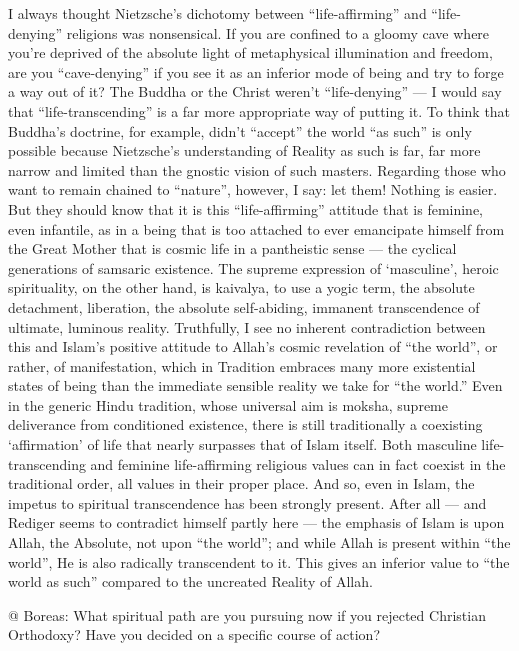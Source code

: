 \begin{footnotesize}
\begin{sffamily}
I always thought Nietzsche's dichotomy between ``life-affirming'' and ``life-denying'' religions was nonsensical. If you are confined to a gloomy cave where you're deprived of the absolute light of metaphysical illumination and freedom, are you ``cave-denying'' if you see it as an inferior mode of being and try to forge a way out of it? The Buddha or the Christ weren't ``life-denying'' --- I would say that ``life-transcending'' is a far more appropriate way of putting it. To think that Buddha's doctrine, for example, didn't ``accept'' the world ``as such'' is only possible because Nietzsche's understanding of Reality as such is far, far more narrow and limited than the gnostic vision of such masters. Regarding those who want to remain chained to ``nature'', however, I say: let them! Nothing is easier. But they should know that it is this ``life-affirming'' attitude that is feminine, even infantile, as in a being that is too attached to ever emancipate himself from the Great Mother that is cosmic life in a pantheistic sense --- the cyclical generations of samsaric existence. The supreme expression of `masculine', heroic spirituality, on the other hand, is kaivalya, to use a yogic term, the absolute detachment, liberation, the absolute self-abiding, immanent transcendence of ultimate, luminous reality. Truthfully, I see no inherent contradiction between this and Islam's positive attitude to Allah's cosmic revelation of ``the world'', or rather, of manifestation, which in Tradition embraces many more existential states of being than the immediate sensible reality we take for ``the world.'' Even in the generic Hindu tradition, whose universal aim is moksha, supreme deliverance from conditioned existence, there is still traditionally a coexisting `affirmation' of life that nearly surpasses that of Islam itself. Both masculine life-transcending and feminine life-affirming religious values can in fact coexist in the traditional order, all values in their proper place. And so, even in Islam, the impetus to spiritual transcendence has been strongly present. After all --- and Rediger seems to contradict himself partly here --- the emphasis of Islam is upon Allah, the Absolute, not upon ``the world''; and while Allah is present within ``the world'', He is also radically transcendent to it. This gives an inferior value to ``the world as such'' compared to the uncreated Reality of Allah.

@ Boreas: What spiritual path are you pursuing now if you rejected Christian Orthodoxy? Have you decided on a specific course of action?


\end{sffamily}
\end{footnotesize}
